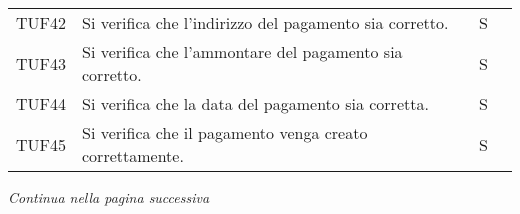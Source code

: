 \begin{table}[H]
\begin{tabular}{c|p{8cm}|c|c}
    TUF42 & Si verifica che l'indirizzo del pagamento sia corretto.                                                & S \\
    TUF43 & Si verifica che l'ammontare del pagamento sia corretto.                                                & S \\
    TUF44 & Si verifica che la data del pagamento sia corretta.                                                    & S \\
    TUF45 & Si verifica che il pagamento venga creato correttamente.                                               & S \\
  \end{tabular}
\end{table}
\begin{center}
  \textit{\small Continua nella pagina successiva}
\end{center}
